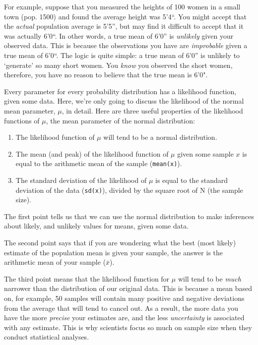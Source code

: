 \documentclass[
]{book}
\begin{document}
For example, suppose that you measured the heights of 100 women in a small town (pop. 1500) and found the average height was 5'4``. You might accept that the \emph{actual} population average is 5'5'', but may find it difficult to accept that it was actually 6'0``. In other words, a true mean of 6'0'' is \emph{unlikely} given your observed data. This is because the observations you have are \emph{improbable} given a true mean of 6'0``. The logic is quite simple: a true mean of 6'0'' is unlikely to `generate' so many short women. You \emph{know} you observed the short women, therefore, you have no reason to believe that the true mean is 6'0".

Every parameter for every probability distribution has a likelihood function, given some data. Here, we're only going to discuss the likelihood of the normal mean parameter, \(\mu\), in detail. Here are three useful properties of the likelihood functions of \(\mu\), the mean parameter of the normal distribution:

\begin{enumerate}
\def\labelenumi{\arabic{enumi}.}
\item
  The likelihood function of \(\mu\) will tend to be a normal distribution.
\item
  The mean (and peak) of the likelihood function of \(\mu\) given some sample \(x\) is equal to the arithmetic mean of the sample (\texttt{mean(x)}).
\item
  The standard deviation of the likelihood of \(\mu\) is equal to the standard deviation of the data (\texttt{sd(x)}), divided by the square root of N (the sample size).
\end{enumerate}

The first point tells us that we can use the normal distribution to make inferences about likely, and unlikely values for means, given some data.

The second point says that if you are wondering what the best (most likely) estimate of the population mean is given your sample, the answer is the arithmetic mean of your sample (\(\bar{x}\)).

The third point means that the likelihood function for \(\mu\) will tend to be \emph{much} narrower than the distribution of our original data. This is because a mean based on, for example, 50 samples will contain many positive and negative deviations from the average that will tend to cancel out. As a result, the more data you have the more \emph{precise} your estimates are, and the less \emph{uncertainty} is associated with any estimate. This is why scientists focus so much on sample size when they conduct statistical analyses.
\end{document}
